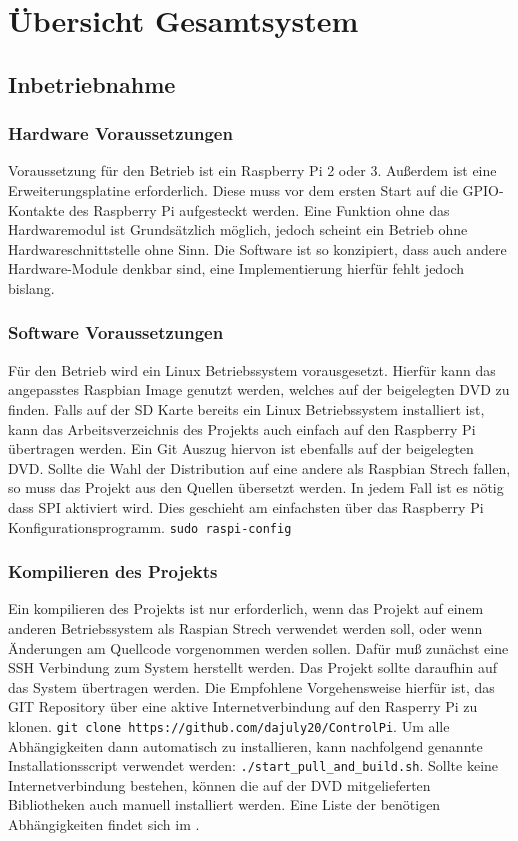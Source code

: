 \section{Übersicht Gesamtsystem}\label{kap:ausw}
 \subsection{Inbetriebnahme}
 \subsubsection{Hardware Voraussetzungen}
 Voraussetzung für den Betrieb ist ein Raspberry Pi 2 oder 3. Außerdem ist eine Erweiterungsplatine  erforderlich. Diese muss vor dem ersten Start auf die GPIO-Kontakte des Raspberry Pi aufgesteckt werden. Eine Funktion ohne das Hardwaremodul ist Grundsätzlich möglich, jedoch scheint ein Betrieb ohne Hardwareschnittstelle ohne Sinn. Die Software ist so konzipiert, dass auch andere Hardware-Module denkbar sind, eine Implementierung hierfür fehlt jedoch bislang.     
 \subsubsection{Software Voraussetzungen}
 Für den Betrieb wird ein Linux Betriebssystem vorausgesetzt. Hierfür kann das angepasstes Raspbian \cite{URL:Raspian} Image genutzt werden, welches auf der beigelegten DVD zu finden. Falls auf der SD Karte bereits ein Linux Betriebssystem installiert ist, kann das Arbeitsverzeichnis des Projekts auch einfach auf den Raspberry Pi übertragen werden. Ein Git Auszug hiervon ist ebenfalls auf der beigelegten DVD. Sollte die Wahl der Distribution auf eine andere als Raspbian Strech \cite{URL:Raspian} fallen, so muss das Projekt aus den Quellen übersetzt werden. In jedem Fall ist es nötig dass SPI aktiviert wird. Dies geschieht am einfachsten über das Raspberry Pi Konfigurationsprogramm. \texttt{sudo raspi-config} 
 \subsubsection{Kompilieren des Projekts}
 Ein kompilieren des Projekts ist nur erforderlich, wenn das Projekt auf einem anderen Betriebssystem als Raspian Strech \cite{URL:Raspian} verwendet werden soll, oder wenn Änderungen am Quellcode vorgenommen werden sollen.  
 Dafür muß zunächst eine SSH Verbindung zum System herstellt werden. Das Projekt sollte daraufhin auf das System übertragen werden. Die Empfohlene Vorgehensweise hierfür ist, das GIT Repository über eine aktive Internetverbindung auf den Rasperry Pi zu klonen. \texttt{git clone https://github.com/dajuly20/ControlPi}. Um alle Abhängigkeiten dann automatisch zu installieren, kann nachfolgend genannte Installationsscript verwendet werden: \texttt{./start\_pull\_and\_build.sh}. Sollte keine Internetverbindung bestehen, können die auf der DVD mitgelieferten Bibliotheken auch manuell installiert werden. 
 Eine Liste der benötigen Abhängigkeiten findet sich im .  
